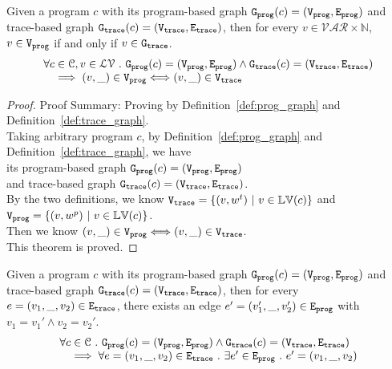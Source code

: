 	\begin{lem}
	\label{lem:vertex_map}
	Given a program $c$ with its
	program-based graph $\mathtt{{G_{prog}}}({c}) = (\mathtt{{V_{prog}}}, \mathtt{{E_{prog}}})$
	and 
	trace-based graph $\mathtt{{G_{trace}}}({c}) = (\mathtt{{V_{trace}}}, \mathtt{{E_{trace}}})$,
	then for every $v \in \mathcal{VAR} \times \mathbb{N}$,
	$v \in \mathtt{{V_{prog}}}$ if and only if $v \in \mathtt{{G_{trace}}}$.
	\[
	\begin{array}{l}
	\forall c \in \mathcal{C} , v \in \mathcal{LV} ~.~ 
	\mathtt{{G_{prog}}}({c}) = (\mathtt{{V_{prog}}}, \mathtt{{E_{prog}}})
	\land 
	\mathtt{{G_{trace}}}({c}) = (\mathtt{{V_{trace}}}, \mathtt{{E_{trace}}})
	\\ \quad
	\implies
	(v, \_) \in \mathtt{{V_{prog}}} \Longleftrightarrow (v, \_) \in \mathtt{{V_{trace}}}
	\end{array}
	\]
	\end{lem}
\begin{proof}
Proof Summary: Proving by Definition~\ref{def:prog_graph} and Definition~\ref{def:trace_graph}.
\\
Taking arbitrary program $c$,
by Definition~\ref{def:prog_graph} and Definition~\ref{def:trace_graph}, 
we have   
\\
its program-based graph $\mathtt{{G_{prog}}}({c}) = (\mathtt{{V_{prog}}}, \mathtt{{E_{prog}}})$ 
\\
and 
trace-based graph $\mathtt{{G_{trace}}}({c}) = (\mathtt{{V_{trace}}}, \mathtt{{E_{trace}}})$.
\\
By the two definitions, we know 
$\mathtt{{V_{trace}}}  = \{(v, w^t) ~|~ v \in \mathbb{LV}(c)\}$ and $\mathtt{{V_{prog}}} = \{(v, w^p) ~|~ v \in \mathbb{LV}(c)\}$.
\\
Then we know $(v, \_) \in \mathtt{{V_{prog}}} \Longleftrightarrow (v, \_) \in \mathtt{{V_{trace}}}$.
\\
This theorem is proved.
\end{proof}
%
	\begin{lem}
	\label{lem:edge_map}
	Given a program $c$ with its
	program-based graph $\mathtt{{G_{prog}}}({c}) = (\mathtt{{V_{prog}}}, \mathtt{{E_{prog}}})$
	and 
	trace-based graph $\mathtt{{G_{trace}}}({c}) = (\mathtt{{V_{trace}}}, \mathtt{{E_{trace}}})$,
	then for every $e = (v_1, \_, v_2) \in \mathtt{{E_{trace}}}$, there exists an edge 
	$e' = (v_1', \_, v_2') \in \mathtt{{E_{prog}}}$ with 
	$v_1 = v_1' \land v_2 = v_2'$.
	\[
	\begin{array}{l}
	\forall c \in \mathcal{C} ~.~
	 \mathtt{{G_{prog}}}({c}) = (\mathtt{{V_{prog}}}, \mathtt{{E_{prog}}})
	\land 
	\mathtt{{G_{trace}}}({c}) = (\mathtt{{V_{trace}}}, \mathtt{{E_{trace}}})
	\\ \quad
	\implies
	\forall e = (v_1, \_, v_2) \in \mathtt{{E_{trace}}}
	~.~ 
	\exists e' \in \mathtt{{E_{prog}}} ~.~ e' = (v_1, \_, v_2)
	\end{array}
	\]
	\end{lem}
